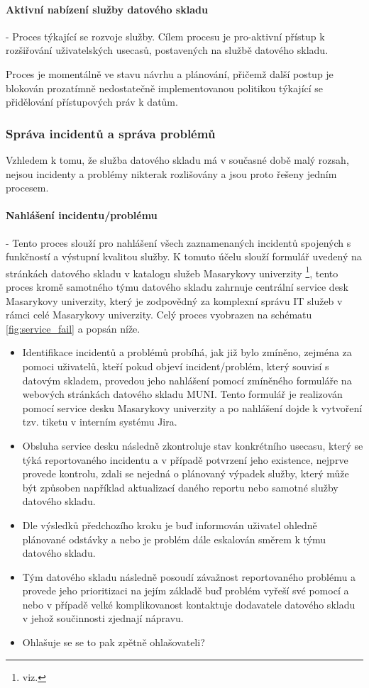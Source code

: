 \documentclass[
  digital,     %
  twoside,     %
  lof,         %
  lot,         %
]{fithesis4}
\begin{document}
\paragraph{Aktivní nabízení služby datového skladu} - Proces týkající se rozvoje služby. Cílem procesu je pro-aktivní přístup k rozšiřování uživatelských usecasů, postavených na službě datového skladu.

Proces je momentálně ve stavu návrhu a plánování, přičemž další postup je blokován prozatímně nedostatečně implementovanou politikou týkající se přidělování přístupových práv k datům.

\subsubsection{Správa incidentů a správa problémů}
Vzhledem k tomu, že služba datového skladu má v současné době malý rozsah, nejsou incidenty a problémy nikterak rozlišovány a jsou proto řešeny jedním procesem. 

\paragraph{Nahlášení incidentu/problému} - Tento proces slouží pro nahlášení všech zaznamenaných incidentů spojených s funkčností a výstupní kvalitou služby. K tomuto účelu slouží formulář uvedený na stránkách datového skladu v katalogu služeb Masarykovy univerzity \footnote{viz. }, tento proces kromě samotného týmu datového skladu zahrnuje centrální service desk Masarykovy univerzity, který je zodpovědný za komplexní správu IT služeb v rámci celé Masarykovy univerzity. Celý proces vyobrazen na schématu \ref{fig:service_fail} a popsán níže.
    \begin{itemize}
        \item Identifikace incidentů a problémů probíhá, jak již bylo zmíněno, zejména za pomoci uživatelů, kteří pokud objeví incident/problém, který souvisí s datovým skladem, provedou jeho nahlášení pomocí zmíněného formuláře na webových stránkách datového skladu MUNI. Tento formulář je realizován pomocí service desku Masarykovy univerzity a po nahlášení dojde k vytvoření tzv. tiketu v interním systému Jira. 
        \item Obsluha service desku následně zkontroluje stav konkrétního usecasu, který se týká reportovaného incidentu a v případě potvrzení jeho existence, nejprve provede kontrolu, zdali se nejedná o plánovaný výpadek služby, který může být způsoben například aktualizací daného reportu nebo samotné služby datového skladu. 
        \item Dle výsledků předchozího kroku je buď informován uživatel ohledně plánované odstávky a nebo je problém dále eskalován směrem k týmu datového skladu. 
        \item Tým datového skladu následně posoudí závažnost reportovaného problému a provede jeho prioritizaci na jejím základě buď problém vyřeší své pomocí a nebo v případě velké komplikovanost kontaktuje dodavatele datového skladu v jehož součinnosti zjednají nápravu. 
        \item Ohlašuje se se to pak zpětně ohlašovateli?
    \end{itemize}
        
\end{document}
